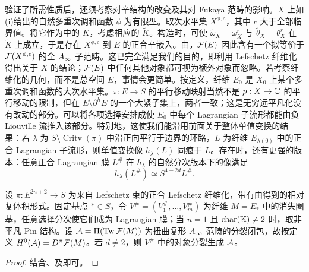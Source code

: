 验证了所需性质后，还须考察对辛结构的改变及其对 Fukaya 范畴的影响。$X$ 上如(i)给出的自然多重次调和函数 $\phi$ 为有限型。取次水平集 $X^{\phi,c}$，其中 $c$ 大于全部临界值。将它作为中的 $K$，考虑相应的 $\widetilde K$。构造时，可使 $\widetilde\omega_X=\omega_X^r$ 与 $\widetilde\theta_X=\theta_X^r$ 在 $\widetilde K$ 上成立，于是存在 $X^{\phi,c}$ 到 $E$ 的正合辛嵌入。由，$\mathcal F(E)$ 因此含有一个拟等价于 $\mathcal F(X^{\phi,c})$ 的全 $A_\infty$ 子范畴。这已完全满足我们的目的，即利用 Lefschetz 纤维化得出关于 $X$ 的结论；$\mathcal F(E)$ 中任何其他对象都可视为额外对象而忽略。若考察纤维化的几何，而不是总空间 $E$，事情会更简单。按定义，纤维 $E_0$ 是 $X_0$ 上某个多重次调和函数的大次水平集。$\pi:E\to S$ 的平行移动映射当然不是 $p:X\to\mathbb C$ 的平行移动的限制，但在 $E\setminus\partial^hE$ 的一个大紧子集上，两者一致；这是无穷远平凡化没有改动的部分。可以将各项选择安排成使 $E_0$ 中每个 Lagrangian 子流形都能由负 Liouville 流推入该部分。特别地，这使我们能沿用前面关于整体单值变换的结果：若 $\lambda$ 为 $S\setminus\operatorname{Critv}(\pi)$ 中沿正向平行于边界的环路，$L$ 为纤维
$E_{\lambda(0)}$ 中的正合 Lagrangian 子流形，则单值变换像 $h_\lambda(L)$ 同痕于 $L$。存在时，还有更强的版本：任意正合 Lagrangian 膜 $L^\#$ 在 $h_\lambda$ 的自然分次版本下的像满足
\begin{equation}\label{eq:19.4}
h_\lambda(L^\#)\simeq S^{4-2d}L^\#.
\end{equation}

\begin{proposition}\label{st:19.7}
设 $\pi:E^{2n+2}\to S$ 为来自 Lefschetz 束的正合 Lefschetz 纤维化，带有由得到的相对复体积形式。固定基点 $*\in S$，令 $V^\#=(V_1^\#,\ldots,V_m^\#)$ 为纤维 $M=E_*$ 中的消失圈基，任意选择分次使它们成为 Lagrangian 膜；当 $n=1$ 且 $\operatorname{char}(\mathbb K)\ne2$ 时，取非平凡 Pin 结构。设 $\mathcal A=\Pi(\operatorname{Tw}\mathcal F(M))$ 为扭曲复形 $A_\infty$ 范畴的分裂闭包，故按定义 $H^0(\mathcal A)=D^\pi\mathcal F(M)$。若 $d\ne2$，则 $V^\#$ 中的对象分裂生成 $\mathcal A$。
\end{proposition}
\begin{proof}
结合、及即可。
\end{proof}

